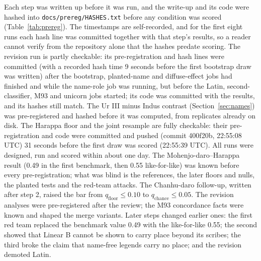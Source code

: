 \documentclass[11pt,a4paper]{article}
\newcommand{\sign}[1]{\textsf{#1}}
\begin{document}
Each step was written up before it was run, and the write-up and its code were hashed into \nolinkurl{docs/prereg/HASHES.txt} before any condition was scored (Table~\ref{tab:prereg}).
The timestamps are self-recorded, and for the first eight runs each hash line was committed together with that step's results, so a reader cannot verify from the repository alone that the hashes predate scoring. %
The revision run is partly checkable: its pre-registration and hash lines were committed (with a recorded hash time 9 seconds before the first bootstrap draw was written) after the bootstrap, planted-name and diffuse-effect jobs had finished and while the name-role job was running, but before the Latin, second-classifier, \sign{M93} and unicorn jobs started; its code was committed with the results, and its hashes still match. %
The Ur III minus Indus contrast (Section~\ref{sec:names}) was pre-registered and hashed before it was computed, from replicates already on disk.
The Harappa floor and the joint resample are fully checkable: their pre-registration and code were committed and pushed (commit 400f20b, 22:55:08 UTC) 31 seconds before the first draw was scored (22:55:39 UTC). %
All runs were designed, run and scored within about one day. %
The Mohenjo-daro--Harappa result (0.49 in the first benchmark, then 0.55 like-for-like) was known before every pre-registration; what was blind is the references, the later floors and nulls, the planted tests and the red-team attacks. %
The Chanhu-daro follow-up, written after step 2, raised the bar from $q_{\mathrm{floor}} \leq 0.10$ to $q_{\mathrm{chance}} \leq 0.05$. %
The revision analyses were pre-registered after the review; the M93 concordance facts were known and shaped the merge variants. %
Later steps changed earlier ones: the first red team replaced the benchmark value 0.49 with the like-for-like 0.55; the second showed that Linear B cannot be shown to carry place beyond its scribes; the third broke the claim that name-free legends carry no place; and the revision demoted Latin. %
\end{document}
